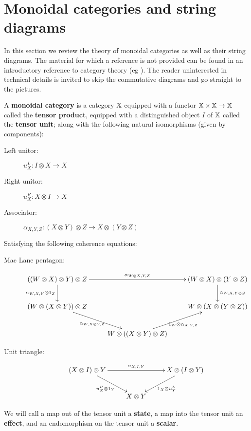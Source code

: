 
\section{Monoidal categories and string diagrams}
\label{subsec:moncat}

In this section we review the theory of monoidal categories as well as their string diagrams.   The material for which a reference is not provided can be found in an introductory reference to category theory (eg  \cite{maclane}).  The reader uninterested in technical details is invited to skip the commutative diagrams and go straight to the pictures.

\begin{definition}
A {\bf monoidal category} is a category $\mathbb{X}$ equipped with a functor $\mathbb{X}\times\mathbb{X}\to \mathbb{X}$ called the {\bf tensor product}, equipped with a distinguished object $I$ of $\mathbb{X}$ called the {\bf tensor unit}; along with the following natural isomorphisms (given by components):

\begin{description}
\item[Left unitor:]
\hfil$
u_X^L:I\otimes X \to X
$
\item[Right unitor:]
\hfil$
u_X^R: X\otimes I \to X
$
\item[Associator:]
\hfil$
\alpha_{X,Y,Z}:(X\otimes Y)\otimes Z \to X\otimes(Y\otimes Z)
$
\end{description}

Satisfying the following coherence equations:

\begin{description}
\item[Mac Lane pentagon:]
$$
\xymatrix{
  ((W\otimes X )\otimes Y)\otimes Z \ar[rr]^{\alpha_{W\otimes X,Y,Z}} \ar[d]_{\alpha_{W,X,Y}\otimes 1_Z}
    &
    & (W\otimes X )\otimes (Y\otimes Z) \ar[d]^{\alpha_{W, X,Y\otimes Z}}
  \\  (W\otimes(X\otimes Y))\otimes Z \ar[dr]_{\alpha_{W,X\otimes Y,Z}}
    & 
    & W\otimes (X\otimes(Y\otimes Z)) 
  \\&
    W\otimes ((X\otimes Y)\otimes Z) \ar[ur]_{1_W\otimes \alpha_{X,Y,Z}}
}
$$
\item[Unit triangle:]
$$
\xymatrix{
  (X\otimes I)\otimes Y \ar[rr]^{\alpha_{X,I,Y}} \ar[dr]_{u_X^{R}\otimes 1_Y}
    &
    & X\otimes (I\otimes Y) \ar[dl]^{1_X\otimes u_Y^{L}}\\
  & X\otimes Y
}
$$
\end{description}
We will call a map out of the tensor unit a {\bf state}, a map into the tensor unit an {\bf effect}, and an endomorphism on the tensor unit a {\bf scalar}.
\end{definition}
